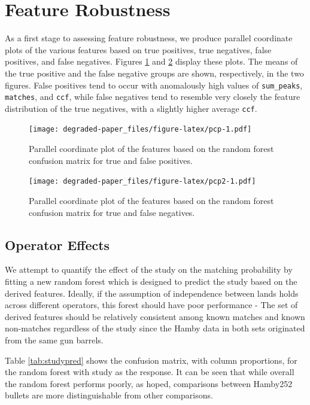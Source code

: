 \documentclass[12pt,]{article}
\theoremstyle{definition}
\theoremstyle{definition}
\theoremstyle{definition}
\theoremstyle{remark}
\begin{document}
\section{Feature Robustness}\label{feature-robustness}

As a first stage to assessing feature robustness, we produce parallel
coordinate plots of the various features based on true positives, true
negatives, false positives, and false negatives. Figures \ref{fig:pcp}
and \ref{fig:pcp2} display these plots. The means of the true positive
and the false negative groups are shown, respectively, in the two
figures. False positives tend to occur with anomalously high values of
\texttt{sum\_peaks}, \texttt{matches}, and \texttt{ccf}, while false
negatives tend to resemble very closely the feature distribution of the
true negatives, with a slightly higher average \texttt{ccf}.

\begin{figure}[htbp]
\centering
\texttt{[image: degraded-paper\_files/figure-latex/pcp-1.pdf]}
\caption{\label{fig:pcp}Parallel coordinate plot of the features based on
the random forest confusion matrix for true and false positives.}
\end{figure}

\begin{figure}[htbp]
\centering
\texttt{[image: degraded-paper\_files/figure-latex/pcp2-1.pdf]}
\caption{\label{fig:pcp2}Parallel coordinate plot of the features based on
the random forest confusion matrix for true and false negatives.}
\end{figure}

\subsection{Operator Effects}\label{operator-effects}

We attempt to quantify the effect of the study on the matching
probability by fitting a new random forest which is designed to predict
the study based on the derived features. Ideally, if the assumption of
independence between lands holds across different operators, this forest
should have poor performance - The set of derived features should be
relatively consistent among known matches and known non-matches
regardless of the study since the Hamby data in both sets originated
from the same gun barrels.

Table \ref{tab:studypred} shows the confusion matrix, with column
proportions, for the random forest with study as the response. It can be
seen that while overall the random forest performs poorly, as hoped,
comparisons between Hamby252 bullets are more distinguishable from other
comparisons.
\end{document}
